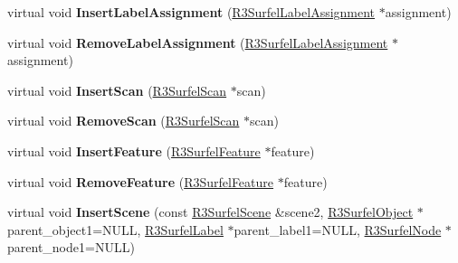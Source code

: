 \begin{DoxyCompactItemize}
\item 
virtual void {\bfseries Insert\+Label\+Assignment} (\hyperlink{class_r3_surfel_label_assignment}{R3\+Surfel\+Label\+Assignment} $\ast$assignment)\hypertarget{class_r3_surfel_scene_aeca672ddfce30f9f49e957794dc55a57}{}\label{class_r3_surfel_scene_aeca672ddfce30f9f49e957794dc55a57}

\item 
virtual void {\bfseries Remove\+Label\+Assignment} (\hyperlink{class_r3_surfel_label_assignment}{R3\+Surfel\+Label\+Assignment} $\ast$assignment)\hypertarget{class_r3_surfel_scene_ab0e26b98501b18016e2bf5f1f799984a}{}\label{class_r3_surfel_scene_ab0e26b98501b18016e2bf5f1f799984a}

\item 
virtual void {\bfseries Insert\+Scan} (\hyperlink{class_r3_surfel_scan}{R3\+Surfel\+Scan} $\ast$scan)\hypertarget{class_r3_surfel_scene_a46ede81772f690d39f3e742e7ccfb8d4}{}\label{class_r3_surfel_scene_a46ede81772f690d39f3e742e7ccfb8d4}

\item 
virtual void {\bfseries Remove\+Scan} (\hyperlink{class_r3_surfel_scan}{R3\+Surfel\+Scan} $\ast$scan)\hypertarget{class_r3_surfel_scene_a9a11318e18837dd55bfb0e1f9e8fd340}{}\label{class_r3_surfel_scene_a9a11318e18837dd55bfb0e1f9e8fd340}

\item 
virtual void {\bfseries Insert\+Feature} (\hyperlink{class_r3_surfel_feature}{R3\+Surfel\+Feature} $\ast$feature)\hypertarget{class_r3_surfel_scene_a0536a7acda168fe260bcc899dd55bf90}{}\label{class_r3_surfel_scene_a0536a7acda168fe260bcc899dd55bf90}

\item 
virtual void {\bfseries Remove\+Feature} (\hyperlink{class_r3_surfel_feature}{R3\+Surfel\+Feature} $\ast$feature)\hypertarget{class_r3_surfel_scene_a65e9684c631df43dfef3d7e12f83fb1f}{}\label{class_r3_surfel_scene_a65e9684c631df43dfef3d7e12f83fb1f}

\item 
virtual void {\bfseries Insert\+Scene} (const \hyperlink{class_r3_surfel_scene}{R3\+Surfel\+Scene} \&scene2, \hyperlink{class_r3_surfel_object}{R3\+Surfel\+Object} $\ast$parent\+\_\+object1=N\+U\+LL, \hyperlink{class_r3_surfel_label}{R3\+Surfel\+Label} $\ast$parent\+\_\+label1=N\+U\+LL, \hyperlink{class_r3_surfel_node}{R3\+Surfel\+Node} $\ast$parent\+\_\+node1=N\+U\+LL)\hypertarget{class_r3_surfel_scene_ac71b934287f70616a51ab6e89e1cb05b}{}\label{class_r3_surfel_scene_ac71b934287f70616a51ab6e89e1cb05b}


\end{DoxyCompactItemize}
